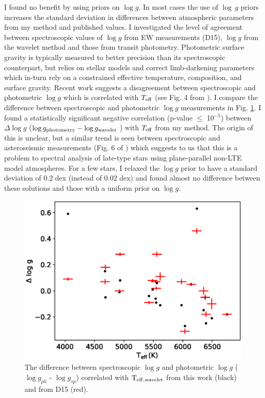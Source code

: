I found no benefit by using priors on $\log g$. In most cases the use of $\log\,g$ priors increases the standard deviation in differences between atmospheric parameters from my method and published values. I investigated the level of agreement between spectroscopic values of $\log g$ from EW measurements (D15), $\log g$ from the wavelet method and those from transit photometry. Photometric surface gravity is typically measured to better precision than its spectroscopic counterpart, but relies on stellar models and correct limb-darkening parameters which in-turn rely on a constrained effective temperature, composition, and surface gravity. Recent work suggests a disagreement between spectroscopic and photometric $\log g$ which is correlated with $T_{\rm eff}$ (see Fig. 4 from \citet{Doyle2017}). I compare the difference between spectroscopic and photometric $\log g$ measurements in Fig. \ref{wavelet:fig:mortlogg}. I found a statistically significant negative correlation (p-value $\leq$ 10$^{-5}$) between $\Delta \log g$ ($\log g_{\rm photometry} - \log g_{\rm wavelet}$ ) with $T_{\rm eff}$ from my method. The origin of this is unclear, but a similar trend is seen between spectroscopic and asteroseismic measurements (Fig. 6 of \citet{Mortier2014}) which suggests to us that this is a problem to spectral analysis of late-type stars using plane-parallel non-LTE model atmospheres. For a few stars, I relaxed the $\log g$ prior to have a standard deviation of $0.2$ dex (instead of $0.02$ dex) and found almost no difference between these solutions and those with a uniform prior on $\log g$.  


  \begin{figure}[ht!]
\centering
\includegraphics[width=\textwidth]{5-images/mortlogg}
\caption{The difference between spectroscopic $\log g$ and photometric $\log g$ ($\log g_{ph}$ - $\log g_{sp}$) correlated with $\rm T_{\rm eff, \rm wavelet}$ from this work (black) and from D15 (red).}
\label{wavelet:fig:mortlogg}
\end{figure}

